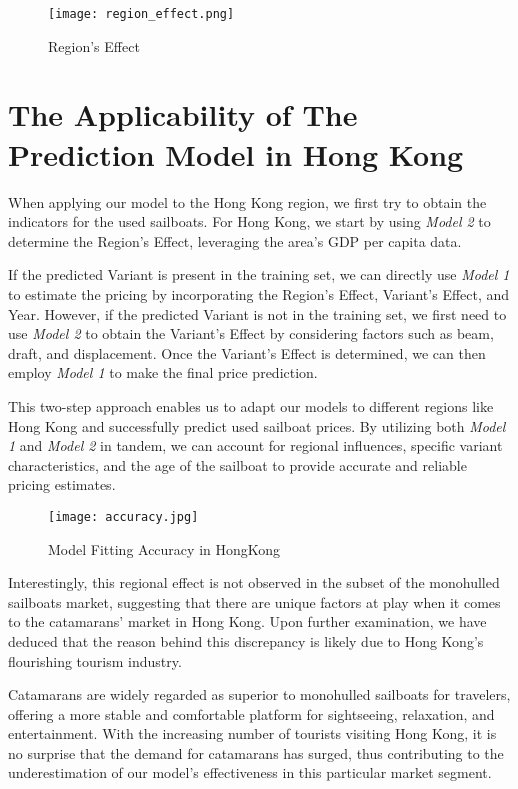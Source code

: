 \documentclass[12pt]{article}  %
\begin{document}
\begin{figure}[htbp]
    \centering
    \texttt{[image: region\_effect.png]}
    \caption{Region's Effect}\label{fig:region_effect}
\end{figure}


\section{The Applicability of The Prediction Model in Hong Kong}
When applying our model to the Hong Kong region, 
we first try to obtain the indicators for the used sailboats. 
For Hong Kong, we start by using \emph{Model 2} to determine the Region's Effect, leveraging the area's GDP per capita data.

If the predicted Variant is present in the training set, 
we can directly use \emph{Model 1} to estimate the pricing by incorporating the Region's Effect, Variant's Effect, and Year. 
However, if the predicted Variant is not in the training set, we first need to use \emph{Model 2} to obtain the Variant's Effect by considering factors such as beam, draft, and displacement. 
Once the Variant's Effect is determined, we can then employ \emph{Model 1} to make the final price prediction.

This two-step approach enables us to adapt our models to different regions like Hong Kong and successfully predict used sailboat prices. 
By utilizing both \emph{Model 1} and \emph{Model 2} in tandem, we can account for regional influences, specific variant characteristics, 
and the age of the sailboat to provide accurate and reliable pricing estimates.

\begin{figure}[htbp]
    \centering
    \texttt{[image: accuracy.jpg]}
    \caption{Model Fitting Accuracy in HongKong}\label{fig:HongKong}
\end{figure}

Interestingly, this regional effect is not observed in the subset of the monohulled sailboats market, suggesting that there are unique factors at play when it comes to the catamarans' market in Hong Kong. Upon further examination, we have deduced that the reason behind this discrepancy is likely due to Hong Kong's flourishing tourism industry.

Catamarans are widely regarded as superior to monohulled sailboats for travelers, offering a more stable and comfortable platform for sightseeing, relaxation, and entertainment. With the increasing number of tourists visiting Hong Kong, it is no surprise that the demand for catamarans has surged, thus contributing to the underestimation of our model's effectiveness in this particular market segment.
\end{document}
